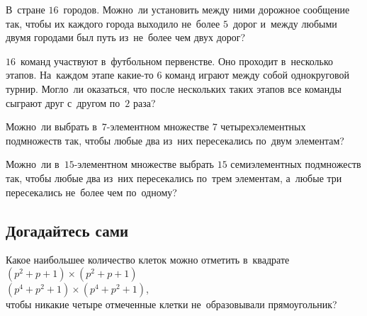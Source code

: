 \begin{problems}

\item
В~стране $16$~городов.
Можно~ли установить между ними дорожное сообщение так, чтобы их каждого города
выходило не~более $5$~дорог и~между любыми двумя городами был путь из~не~более
чем двух дорог?

\item
$16$~команд участвуют в~футбольном первенстве.
Оно проходит в~несколько этапов.
На~каждом этапе какие-то 6 команд играют между собой однокруговой турнир.
Могло~ли оказаться, что после нескольких таких этапов все команды сыграют друг
с~другом по~$2$ раза?

\item
Можно~ли выбрать в~$7$-элементном множестве $7$ четырехэлементных подмножеств
так, чтобы любые два из~них пересекались по~двум элементам?

\item
Можно~ли в~$15$-элементном множестве выбрать $15$ семиэлементных подмножеств
так, чтобы любые два из~них пересекались по~трем элементам, а~любые три
пересекались не~более чем по~одному?

\end{problems}

\subsection*{Догадайтесь сами}

\begin{problems}

\item
Какое наибольшее количество клеток можно отметить в~квадрате
\\
\subproblem $(p^{2} + p + 1) \times (p^{2} + p + 1)$
\\
\subproblem $(p^{4} + p^2 + 1) \times (p^{4} + p^2 +1)$,
\\
чтобы никакие четыре отмеченные клетки не~образовывали прямоугольник?

\end{problems}

